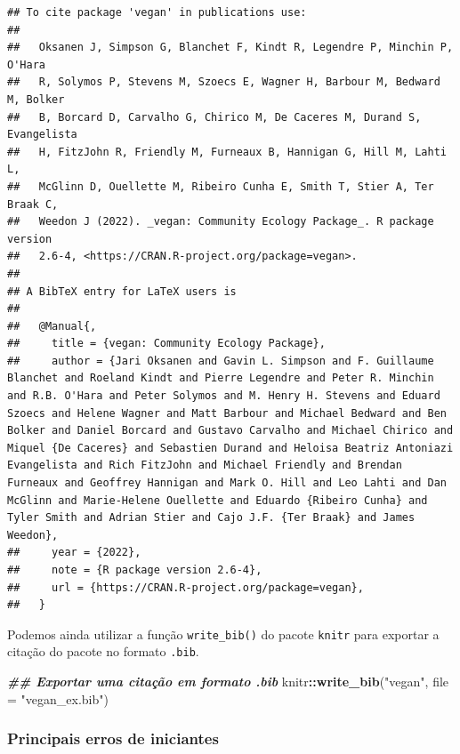 \documentclass[
]{article}
\newenvironment{Shaded}{\begin{snugshade}}{\end{snugshade}}
\newcommand{\AttributeTok}[1]{\textcolor[rgb]{0.13,0.29,0.53}{#1}}
\newcommand{\DocumentationTok}[1]{\textcolor[rgb]{0.56,0.35,0.01}{\textbf{\textit{#1}}}}
\newcommand{\FunctionTok}[1]{\textcolor[rgb]{0.13,0.29,0.53}{\textbf{#1}}}
\newcommand{\NormalTok}[1]{#1}
\newcommand{\SpecialCharTok}[1]{\textcolor[rgb]{0.81,0.36,0.00}{\textbf{#1}}}
\newcommand{\StringTok}[1]{\textcolor[rgb]{0.31,0.60,0.02}{#1}}
\begin{document}
\begin{verbatim}
## To cite package 'vegan' in publications use:
## 
##   Oksanen J, Simpson G, Blanchet F, Kindt R, Legendre P, Minchin P, O'Hara
##   R, Solymos P, Stevens M, Szoecs E, Wagner H, Barbour M, Bedward M, Bolker
##   B, Borcard D, Carvalho G, Chirico M, De Caceres M, Durand S, Evangelista
##   H, FitzJohn R, Friendly M, Furneaux B, Hannigan G, Hill M, Lahti L,
##   McGlinn D, Ouellette M, Ribeiro Cunha E, Smith T, Stier A, Ter Braak C,
##   Weedon J (2022). _vegan: Community Ecology Package_. R package version
##   2.6-4, <https://CRAN.R-project.org/package=vegan>.
## 
## A BibTeX entry for LaTeX users is
## 
##   @Manual{,
##     title = {vegan: Community Ecology Package},
##     author = {Jari Oksanen and Gavin L. Simpson and F. Guillaume Blanchet and Roeland Kindt and Pierre Legendre and Peter R. Minchin and R.B. O'Hara and Peter Solymos and M. Henry H. Stevens and Eduard Szoecs and Helene Wagner and Matt Barbour and Michael Bedward and Ben Bolker and Daniel Borcard and Gustavo Carvalho and Michael Chirico and Miquel {De Caceres} and Sebastien Durand and Heloisa Beatriz Antoniazi Evangelista and Rich FitzJohn and Michael Friendly and Brendan Furneaux and Geoffrey Hannigan and Mark O. Hill and Leo Lahti and Dan McGlinn and Marie-Helene Ouellette and Eduardo {Ribeiro Cunha} and Tyler Smith and Adrian Stier and Cajo J.F. {Ter Braak} and James Weedon},
##     year = {2022},
##     note = {R package version 2.6-4},
##     url = {https://CRAN.R-project.org/package=vegan},
##   }
\end{verbatim}

Podemos ainda utilizar a função \texttt{write\_bib()} do pacote \texttt{knitr} para exportar a citação do pacote no formato \texttt{.bib}.

\begin{Shaded}
\begin{Highlighting}[]
\DocumentationTok{\#\# Exportar uma citação em formato .bib}
\NormalTok{knitr}\SpecialCharTok{::}\FunctionTok{write\_bib}\NormalTok{(}\StringTok{"vegan"}\NormalTok{, }\AttributeTok{file =} \StringTok{"vegan\_ex.bib"}\NormalTok{)}
\end{Highlighting}
\end{Shaded}

\hypertarget{principais-erros-de-iniciantes}{%
\subsubsection{Principais erros de iniciantes}\label{principais-erros-de-iniciantes}}
\end{document}
